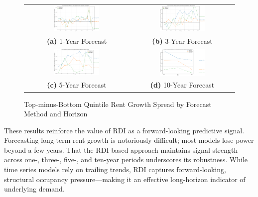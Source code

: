 \documentclass[APA,Times1COL]{WileyNJDv5} %
\begin{document}
\begin{figure}[h!]
	\centering
	\begin{tabular}{cc}
		\includegraphics[width=0.45\textwidth]{spread_comparison_over_time_1yr.pdf} &
		\includegraphics[width=0.45\textwidth]{spread_comparison_over_time_3yr.pdf} \\
		\textbf{(a)} 1-Year Forecast & \textbf{(b)} 3-Year Forecast \\
		\includegraphics[width=0.45\textwidth]{spread_comparison_over_time_5yr.pdf} &
		\includegraphics[width=0.45\textwidth]{spread_comparison_over_time_10yr.pdf} \\
		\textbf{(c)} 5-Year Forecast & \textbf{(d)} 10-Year Forecast \\
	\end{tabular}
	\caption{Top-minus-Bottom Quintile Rent Growth Spread by Forecast Method and Horizon}
	\label{fig:spread-comparison-quadrant}
\end{figure}

These results reinforce the value of RDI as a forward-looking predictive signal. Forecasting long-term rent growth is notoriously difficult; most models lose power beyond a few years. That the RDI-based approach maintains signal strength across one-, three-, five-, and ten-year periods underscores its robustness. While time series models rely on trailing trends, RDI captures forward-looking, structural occupancy pressure—making it an effective long-horizon indicator of underlying demand.
\end{document}

